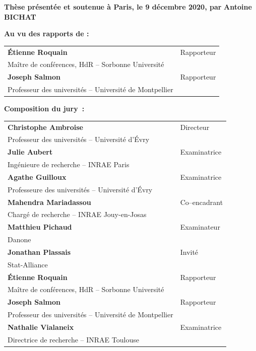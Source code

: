 \documentclass[12pt,a4paper]{reedthesis}
\theoremstyle{definition}
\theoremstyle{definition}
\theoremstyle{definition}
\theoremstyle{remark}
\begin{document}
\begin{titlepage}
\textbf{Thèse présentée et soutenue à Paris, le 9 décembre 2020, par}
\bigskip
\Large {\color{Prune} \textbf{Antoine BICHAT}}


\vspace{15mm}


\flushleft \small
\textbf{Au vu des rapports de :}
\bigskip

{\scriptsize
\begin{tabular}{p{8cm}l}
\textbf{Étienne Roquain} &  Rapporteur \\
Maître de conférences, HdR -- Sorbonne Université   &   \\
\textbf{Joseph Salmon} &  Rapporteur \\
Professeur des universités -- Université de Montpellier  &   \\
\end{tabular}}
\bigskip
\bigskip

\textbf{Composition du jury~:}
\bigskip


\scriptsize
\begin{tabular}{|p{8cm}l}
\arrayrulecolor{Prune}
\textbf{Christophe Ambroise} &  Directeur\\
Professeur des universités -- Université d'Évry & \\
\textbf{Julie Aubert} &  Examinatrice\\
Ingénieure de recherche -- INRAE Paris & \\
\textbf{Agathe Guilloux} &  Examinatrice\\
Professeure des universités -- Université d'Évry & \\
\textbf{Mahendra Mariadassou} &  Co--encadrant\\
Chargé de recherche -- INRAE Jouy-en-Josas & \\
\textbf{Matthieu Pichaud} &  Examinateur\\
Danone & \\
\textbf{Jonathan Plassais} &  Invité\\
Stat-Alliance & \\
\textbf{Étienne Roquain} &  Rapporteur\\
Maître de conférences, HdR -- Sorbonne Université & \\
\textbf{Joseph Salmon} &  Rapporteur\\
Professeur des universités -- Université de Montpellier & \\
\textbf{Nathalie Vialaneix} &  Examinatrice\\
Directrice de recherche -- INRAE Toulouse & \\
\end{tabular}
\end{titlepage}
\frontmatter %
\pagestyle{empty} %
\end{document}
